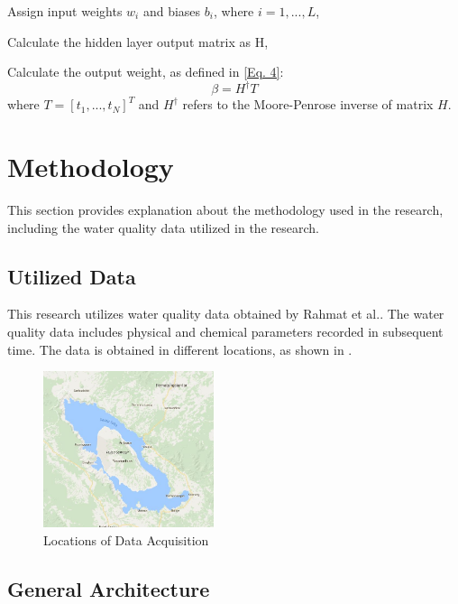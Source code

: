 \documentclass{ws-ijait}
\begin{document}
\begin{itemlist}
\item Assign input weights $w_{i}$ and biases $b_{i}$, where $i = 1, ..., L$,
\item Calculate the hidden layer output matrix as H,
\item Calculate the output weight, as defined in \eqref{Eq. 4}:
\begin{equation}
\beta = H^\dagger T\label{Eq. 4}
\end{equation}
where $T = [t_{1},...,t_{N}]^T$ and $H^\dagger$ refers to the Moore-Penrose inverse of matrix $H$.
\end{itemlist}

\section{Methodology}

This section provides explanation about the methodology used in the research, including the water quality data utilized in the research.

\subsection{Utilized Data}

This research utilizes water quality data obtained by Rahmat et al.\cite{16}. The water quality data includes physical and chemical parameters recorded in subsequent time. The data is obtained in different locations, as shown in .

\begin{figure}[th]
\centerline{\includegraphics[width=5cm]{map_data_acquisition.jpg}}
\vspace*{8pt}
\caption{Locations of Data Acquisition\cite{16}}
\label{Fig. 1}
\end{figure}

\subsection{General Architecture}
\end{document}
